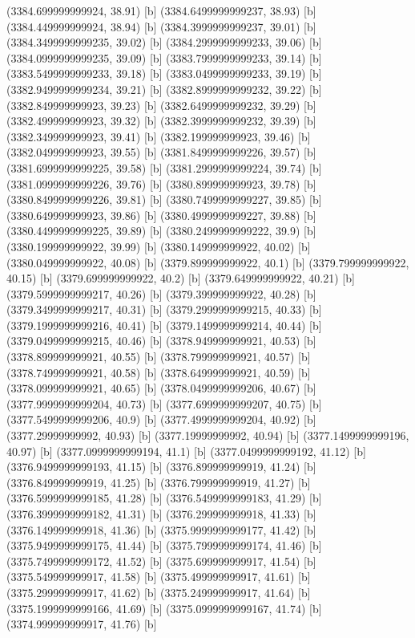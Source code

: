 {{{(3384.699999999924, 38.91) [b] 
(3384.6499999999237, 38.93) [b] 
(3384.449999999924, 38.94) [b] 
(3384.3999999999237, 39.01) [b] 
(3384.3499999999235, 39.02) [b] 
(3384.2999999999233, 39.06) [b] 
(3384.0999999999235, 39.09) [b] 
(3383.7999999999233, 39.14) [b] 
(3383.5499999999233, 39.18) [b] 
(3383.0499999999233, 39.19) [b] 
(3382.9499999999234, 39.21) [b] 
(3382.8999999999232, 39.22) [b] 
(3382.849999999923, 39.23) [b] 
(3382.6499999999232, 39.29) [b] 
(3382.499999999923, 39.32) [b] 
(3382.3999999999232, 39.39) [b] 
(3382.349999999923, 39.41) [b] 
(3382.199999999923, 39.46) [b] 
(3382.049999999923, 39.55) [b] 
(3381.8499999999226, 39.57) [b] 
(3381.6999999999225, 39.58) [b] 
(3381.2999999999224, 39.74) [b] 
(3381.0999999999226, 39.76) [b] 
(3380.899999999923, 39.78) [b] 
(3380.8499999999226, 39.81) [b] 
(3380.7499999999227, 39.85) [b] 
(3380.649999999923, 39.86) [b] 
(3380.4999999999227, 39.88) [b] 
(3380.4499999999225, 39.89) [b] 
(3380.2499999999222, 39.9) [b] 
(3380.199999999922, 39.99) [b] 
(3380.149999999922, 40.02) [b] 
(3380.049999999922, 40.08) [b] 
(3379.899999999922, 40.1) [b] 
(3379.799999999922, 40.15) [b] 
(3379.699999999922, 40.2) [b] 
(3379.649999999922, 40.21) [b] 
(3379.5999999999217, 40.26) [b] 
(3379.399999999922, 40.28) [b] 
(3379.3499999999217, 40.31) [b] 
(3379.2999999999215, 40.33) [b] 
(3379.1999999999216, 40.41) [b] 
(3379.1499999999214, 40.44) [b] 
(3379.0499999999215, 40.46) [b] 
(3378.949999999921, 40.53) [b] 
(3378.899999999921, 40.55) [b] 
(3378.799999999921, 40.57) [b] 
(3378.749999999921, 40.58) [b] 
(3378.649999999921, 40.59) [b] 
(3378.099999999921, 40.65) [b] 
(3378.0499999999206, 40.67) [b] 
(3377.9999999999204, 40.73) [b] 
(3377.6999999999207, 40.75) [b] 
(3377.5499999999206, 40.9) [b] 
(3377.4999999999204, 40.92) [b] 
(3377.29999999992, 40.93) [b] 
(3377.19999999992, 40.94) [b] 
(3377.1499999999196, 40.97) [b] 
(3377.0999999999194, 41.1) [b] 
(3377.0499999999192, 41.12) [b] 
(3376.9499999999193, 41.15) [b] 
(3376.899999999919, 41.24) [b] 
(3376.849999999919, 41.25) [b] 
(3376.799999999919, 41.27) [b] 
(3376.5999999999185, 41.28) [b] 
(3376.5499999999183, 41.29) [b] 
(3376.3999999999182, 41.31) [b] 
(3376.299999999918, 41.33) [b] 
(3376.149999999918, 41.36) [b] 
(3375.9999999999177, 41.42) [b] 
(3375.9499999999175, 41.44) [b] 
(3375.7999999999174, 41.46) [b] 
(3375.7499999999172, 41.52) [b] 
(3375.699999999917, 41.54) [b] 
(3375.549999999917, 41.58) [b] 
(3375.499999999917, 41.61) [b] 
(3375.299999999917, 41.62) [b] 
(3375.249999999917, 41.64) [b] 
(3375.1999999999166, 41.69) [b] 
(3375.0999999999167, 41.74) [b] 
(3374.999999999917, 41.76) [b] 
}}}
